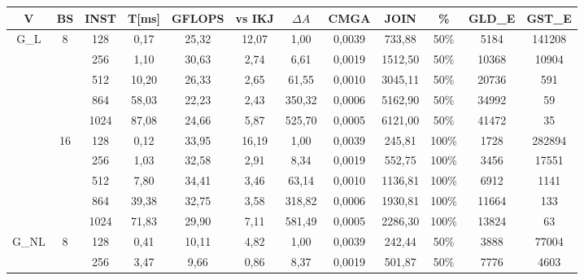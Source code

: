 \documentclass[10pt,a4paper]{article}
\begin{document}
\begin{center}
	\begin{tabular}{ |c|c|c|c|c|c|c|c|c|c|c|c| }
		\hline
		V                       & BS                  & INST & T[ms]  & GFLOPS & vs IKJ & $\Delta A$ & CMGA   & JOIN     & \%    & GLD\_E   & GST\_E  \\ \hline
		\multirow{10}{*}{G\_L}  & \multirow{5}{*}{8}  & 128  & 0,17   & 25,32  & 12,07  & 1,00       & 0,0039 & 733,88   & 50\%  & 5184     & 141208  \\ \cline{3-12}
		                        &                     & 256  & 1,10   & 30,63  & 2,74   & 6,61       & 0,0019 & 1512,50  & 50\%  & 10368    & 10904   \\ \cline{3-12}
		                        &                     & 512  & 10,20  & 26,33  & 2,65   & 61,55      & 0,0010 & 3045,11  & 50\%  & 20736    & 591     \\ \cline{3-12}
		                        &                     & 864  & 58,03  & 22,23  & 2,43   & 350,32     & 0,0006 & 5162,90  & 50\%  & 34992    & 59      \\ \cline{3-12}
		                        &                     & 1024 & 87,08  & 24,66  & 5,87   & 525,70     & 0,0005 & 6121,00  & 50\%  & 41472    & 35      \\ \cline{2-12}
		                        & \multirow{5}{*}{16} & 128  & 0,12   & 33,95  & 16,19  & 1,00       & 0,0039 & 245,81   & 100\% & 1728     & 282894  \\ \cline{3-12}
		                        &                     & 256  & 1,03   & 32,58  & 2,91   & 8,34       & 0,0019 & 552,75   & 100\% & 3456     & 17551   \\ \cline{3-12}
		                        &                     & 512  & 7,80   & 34,41  & 3,46   & 63,14      & 0,0010 & 1136,81  & 100\% & 6912     & 1141    \\ \cline{3-12}
		                        &                     & 864  & 39,38  & 32,75  & 3,58   & 318,82     & 0,0006 & 1930,81  & 100\% & 11664    & 133     \\ \cline{3-12}
		                        &                     & 1024 & 71,83  & 29,90  & 7,11   & 581,49     & 0,0005 & 2286,30  & 100\% & 13824    & 63      \\ \cline{1-12}
		\multirow{10}{*}{G\_NL} & \multirow{5}{*}{8}  & 128  & 0,41   & 10,11  & 4,82   & 1,00       & 0,0039 & 242,44   & 50\%  & 3888     & 77004   \\ \cline{3-12}
		                        &                     & 256  & 3,47   & 9,66   & 0,86   & 8,37       & 0,0019 & 501,87   & 50\%  & 7776     & 4603    \\ \cline{3-12}

\end{tabular}
\end{center}
\end{document}
